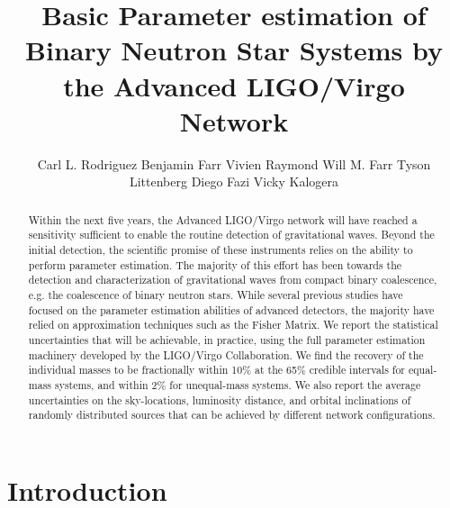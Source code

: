 \documentclass[11pt,a4paper]{emulateapj} 
\begin{document}
\title{Basic Parameter estimation of Binary Neutron Star Systems by
  the Advanced LIGO/Virgo Network} \author{Carl L. Rodriguez
Benjamin Farr 
Vivien Raymond  Will M. Farr 
Tyson Littenberg
Diego Fazi
Vicky Kalogera}

 



\begin{abstract}

Within the next five years, the Advanced LIGO/Virgo network will have
reached a sensitivity sufficient to enable the routine detection of
gravitational waves.  Beyond the initial detection, the scientific
promise of these instruments relies on the ability to perform
parameter estimation. The majority of this effort has been towards the
detection and characterization of gravitational waves from compact
binary coalescence, e.g. the coalescence of binary neutron stars.
While several previous studies have focused on the parameter
estimation abilities of advanced detectors, the majority have relied
on approximation techniques such as the Fisher Matrix.  We report the
statistical uncertainties that will be achievable, in practice, using
the full parameter estimation machinery developed by the LIGO/Virgo
Collaboration.  We find the recovery of the individual masses to be
fractionally within 10\% at the 65\% credible intervals for equal-mass
systems, and within 2\% for unequal-mass systems.  We also report the
average uncertainties on the sky-locations, luminosity distance, and
orbital inclinations of randomly distributed sources that can be
achieved by different network configurations.
\end{abstract}

\maketitle
\section{Introduction}
\end{document}
